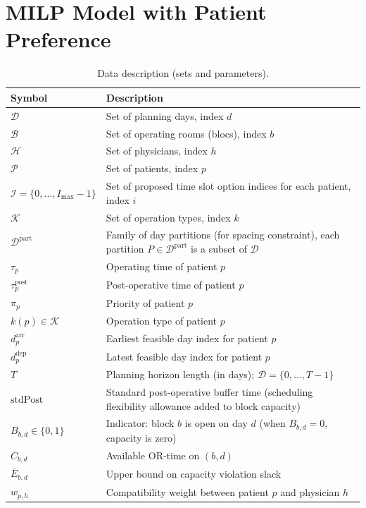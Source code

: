 

\section{MILP Model with Patient Preference}
\begin{table}[ht]
\centering
\caption{Data description (sets and parameters).}
\label{tab:parameters}
\begin{tabular*}{\textwidth}{@{\extracolsep{\fill}}ll}
\toprule
\textbf{Symbol} & \textbf{Description} \\
\midrule
$\mathcal{D}$ & Set of planning days, index $d$ \\
$\mathcal{B}$ & Set of operating rooms (blocs), index $b$ \\
$\mathcal{H}$ & Set of physicians, index $h$ \\
$\mathcal{P}$ & Set of patients, index $p$ \\
$\mathcal{I} = \{0,\dots,I_{\max}-1\}$ & Set of proposed time slot option indices for each patient, index $i$ \\
$\mathcal{K}$ & Set of operation types, index $k$ \\
$\mathcal{D}^{\text{part}}$ & Family of day partitions (for spacing constraint), each partition $P \in \mathcal{D}^{\text{part}}$ is a subset of $\mathcal{D}$ \\
\midrule
$\tau_p$ & Operating time of patient $p$ \\
$\tau^{\text{post}}_p$ & Post-operative time of patient $p$\\
$\pi_p$ & Priority of patient $p$ \\
$k(p)\in\mathcal{K}$ & Operation type of patient $p$\\
$d^{\text{arr}}_p$ & Earliest feasible day index for patient $p$\\
$d^{\text{dep}}_p$ & Latest feasible day index for patient $p$ \\
$T$ & Planning horizon length (in days); $\mathcal{D} = \{0,\ldots,T-1\}$\\
$\text{stdPost}$ & Standard post-operative buffer time (scheduling flexibility allowance added to block capacity) \\
$B_{b,d} \in \{0,1\}$ & Indicator: block $b$ is open on day $d$ (when $B_{b,d}=0$, capacity is zero)\\
$C_{b,d}$ & Available OR-time on $(b,d)$\\
$\overline{E}_{b,d}$ & Upper bound on capacity violation slack \\
$w_{p,h}$ & Compatibility weight between patient $p$ and physician $h$\\

\end{tabular*}
\end{table}
